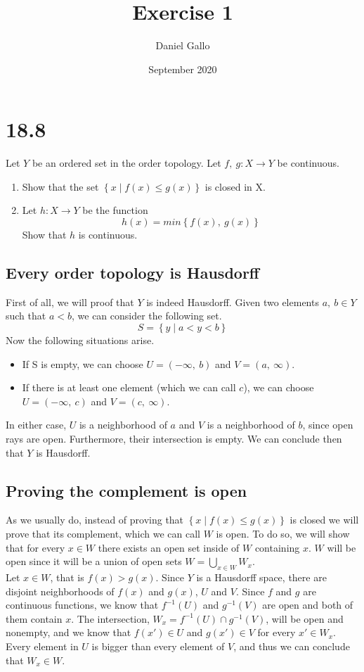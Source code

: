 \documentclass{article}
\title{Exercise 1}
\author{Daniel Gallo}
\date{September 2020}
\begin{document}
\maketitle
\section*{18.8}
Let $Y$ be an ordered set in the order topology. Let $f,\ g \colon X \rightarrow Y$ be continuous.
\begin{enumerate}
    \item Show that the set $\left\{x \mid f(x) \leq g(x)\right\}$ is closed in X.
    \item Let $h\colon X \rightarrow Y$ be the function
    \begin{equation*}
        h(x) = min\left\{f(x),\ g(x)\right\}
    \end{equation*}
    Show that $h$ is continuous.
\end{enumerate}
\subsection*{Every order topology is Hausdorff}
First of all, we will proof that $Y$ is indeed Hausdorff. Given two elements $a,\ b \in Y$ such that $a < b$, we can consider the following set.
\begin{equation*}
    S = \left\{y \mid a < y < b\right\}
\end{equation*}
Now the following situations arise.
\begin{itemize}
    \item If S is empty, we can choose $U = \left(-\infty,\ b\right)$ and $V = \left(a,\ \infty\right)$.
    \item If there is at least one element (which we can call $c$), we can choose $U = \left(-\infty,\ c\right)$ and $V = \left(c,\ \infty\right)$.
\end{itemize}
In either case, $U$ is a neighborhood of $a$ and $V$ is a neighborhood of $b$, since open rays are open. Furthermore, their intersection is empty. We can conclude then that $Y$ is Hausdorff.
\subsection*{Proving the complement is open}
As we usually do, instead of proving that $\left\{x \mid f(x) \leq g(x)\right\}$ is closed we will prove that its complement, which we can call $W$ is open. To do so, we will show that for every $x \in W$ there exists an open set inside of $W$ containing $x$. $W$ will be open since it will be a union of open sets $W = \bigcup\limits_{x \in W}W_x$. 
\\
Let $x \in W$, that is $f(x) > g(x)$. Since $Y$ is a Hausdorff space, there are disjoint neighborhoods of $f(x)$ and $g(x)$, $U$ and $V$. Since $f$ and $g$ are continuous functions, we know that $f^{-1}(U)$ and $g^{-1}(V)$ are open and both of them contain $x$. The intersection, $W_x = f^{-1}(U) \cap g^{-1}(V)$, will be open and nonempty, and we know that $f(x') \in U$ and $g(x') \in V$ for every $x' \in W_x$. Every element in $U$ is bigger than every element of $V$, and thus we can conclude that $W_x \in W$.
\end{document}

